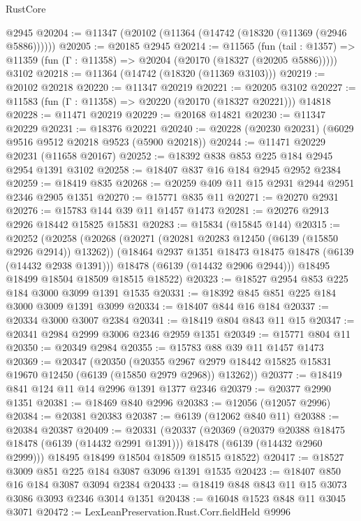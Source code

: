\begin{lexlean}{RustCore}
\begin{coremodule}
    @2945
@20204 := @11347 (@20102 (@11364 (@14742 (@18320 (@11369 (@2946 @5886))))))
@20205 := @20185 @2945
@20214 := @11565
    (fun (tail : @1357) => @11359 (fun (Γ : @11358) => @20204 (@20170 (@18327 (@20205 @5886)))))
    @3102
@20218 := @11364 (@14742 (@18320 (@11369 @3103)))
@20219 := @20102 @20218
@20220 := @11347 @20219
@20221 := @20205 @3102
@20227 := @11583 (fun (Γ : @11358) => @20220 (@20170 (@18327 @20221))) @14818
@20228 := @11471 @20219
@20229 := @20168 @14821
@20230 := @11347 @20229
@20231 := @18376 @20221
@20240 := @20228 (@20230 @20231) (@6029 @9516 @9512 @20218 @9523 (@5900 @20218))
@20244 := @11471 @20229 @20231 (@11658 @20167)
@20252 := @18392 @838 @853 @225 @184 @2945 @2954 @1391 @3102
@20258 := @18407 @837 @16 @184 @2945 @2952 @2384
@20259 := @18419 @835
@20268 := @20259 @409 @11 @15 @2931 @2944 @2951 @2346 @2905 @1351
@20270 := @15771 @835 @11
@20271 := @20270 @2931
@20276 := @15783 @144 @39 @11 @1457 @1473
@20281 := @20276 @2913 @2926 @18442 @15825 @15831
@20283 := @15834 (@15845 @144)
@20315 := @20252
    (@20258
      (@20268
        (@20271 (@20281 @20283 @12450 (@6139 (@15850 @2926 @2914)) @13262))
        (@18464 @2937 @1351 @18473 @18475 @18478 (@6139 (@14432 @2938 @1391)))
        @18478
        (@6139 (@14432 @2906 @2944)))
      @18495
      @18499
      @18504
      @18509
      @18515
      @18522)
@20323 := @18527 @2954 @853 @225 @184 @3000 @3099 @1391 @1535
@20331 := @18392 @845 @851 @225 @184 @3000 @3009 @1391 @3099
@20334 := @18407 @844 @16 @184
@20337 := @20334 @3000 @3007 @2384
@20341 := @18419 @804 @843 @11 @15
@20347 := @20341 @2984 @2999 @3006 @2346 @2959 @1351
@20349 := @15771 @804 @11
@20350 := @20349 @2984
@20355 := @15783 @88 @39 @11 @1457 @1473
@20369 := @20347
    (@20350
      (@20355 @2967 @2979 @18442 @15825 @15831 @19670 @12450 (@6139 (@15850 @2979 @2968)) @13262))
@20377 := @18419 @841 @124 @11 @14 @2996 @1391 @1377 @2346
@20379 := @20377 @2990 @1351
@20381 := @18469 @840 @2996
@20383 := @12056 (@12057 @2996)
@20384 := @20381 @20383
@20387 := @6139 (@12062 @840 @11)
@20388 := @20384 @20387
@20409 := @20331
    (@20337
      (@20369
        (@20379 @20388 @18475 @18478 (@6139 (@14432 @2991 @1391)))
        @18478
        (@6139 (@14432 @2960 @2999)))
      @18495
      @18499
      @18504
      @18509
      @18515
      @18522)
@20417 := @18527 @3009 @851 @225 @184 @3087 @3096 @1391 @1535
@20423 := @18407 @850 @16 @184 @3087 @3094 @2384
@20433 := @18419 @848 @843 @11 @15 @3073 @3086 @3093 @2346 @3014 @1351
@20438 := @16048 @1523 @848 @11 @3045 @3071
@20472 := LexLeanPreservation.Rust.Corr.fieldHeld
    @9996

\end{coremodule}
\end{lexlean}
